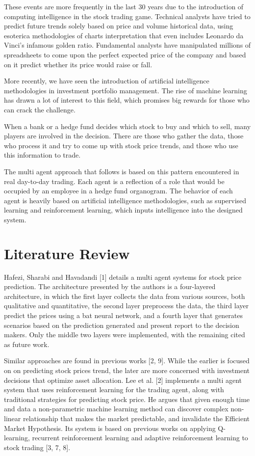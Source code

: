 \documentclass[prodmode,acmtecs]{acmsmall} %
\begin{document}
These events are more frequently in the last 30 years due to the introduction of computing intelligence in the stock trading game. Technical analysts have tried to predict future trends solely based on price and volume historical data, using esoterica methodologies of charts interpretation that even includes Leonardo da Vinci’s infamous golden ratio. Fundamental analysts have manipulated millions of spreadsheets to come upon the perfect expected price of the company and based on it predict whether its price would raise or fall.

More recently, we have seen the introduction of artificial intelligence methodologies in investment portfolio management. The rise of machine learning has drawn a lot of interest to this field, which promises big rewards for those who can crack the challenge.

When a bank or a hedge fund decides which stock to buy and which to sell, many players are involved in the decision. There are those who gather the data, those who process it and try to come up with stock price trends, and those who use this information to trade.

The multi agent approach that follows is based on this pattern encountered in real day-to-day trading. Each agent is a reflection of a role that would be occupied by an employee in a hedge fund organogram. The behavior of each agent is heavily based on artificial intelligence methodologies, such as supervised learning and reinforcement learning, which inputs intelligence into the designed system.

\section{Literature Review}

Hafezi, Sharabi and Havadandi [1] details a multi agent systems for stock price prediction. The architecture presented by the authors is a four-layered architecture, in which the first layer collects the data from various sources, both qualitative and quantitative, the second layer preprocess the data, the third layer predict the prices using a bat neural network, and a fourth layer that generates scenarios based on the prediction generated and present report to the decision makers. Only the middle two layers were implemented, with the remaining cited as future work. 

Similar approaches are found in previous works [2, 9]. While the earlier is focused on on predicting stock prices trend, the later are more concerned with investment decisions that optimize asset allocation. Lee et al. [2] implements a multi agent system that uses reinforcement learning for the trading agent, along with traditional strategies for predicting stock price. He argues that given enough time and data a non-parametric machine learning method can discover complex non-linear relationship that makes the market predictable, and invalidate the Efficient Market Hypothesis. Its system is based on previous works on applying Q-learning, recurrent  reinforcement learning and adaptive reinforcement learning to stock trading [3, 7, 8].
\end{document}
